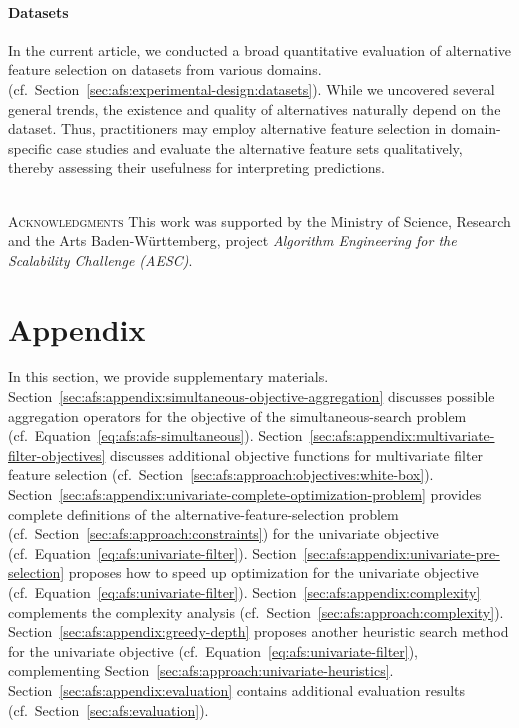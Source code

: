 \documentclass{article}
\theoremstyle{definition}
\begin{document}
\paragraph{Datasets}

In the current article, we conducted a broad quantitative evaluation of alternative feature selection on datasets from various domains. (cf.~Section~\ref{sec:afs:experimental-design:datasets}).
While we uncovered several general trends, the existence and quality of alternatives naturally depend on the dataset.
Thus, practitioners may employ alternative feature selection in domain-specific case studies and evaluate the alternative feature sets qualitatively, thereby assessing their usefulness for interpreting predictions.

~\\
\noindent \textsc{Acknowledgments}\quad
This work was supported by the Ministry of Science, Research and the Arts Baden-Württemberg, project \emph{Algorithm Engineering for the Scalability Challenge (AESC)}.

\appendix

\section{Appendix}
\label{sec:afs:appendix}

In this section, we provide supplementary materials.
Section~\ref{sec:afs:appendix:simultaneous-objective-aggregation} discusses possible aggregation operators for the objective of the simultaneous-search problem (cf.~Equation~\ref{eq:afs:afs-simultaneous}).
Section~\ref{sec:afs:appendix:multivariate-filter-objectives} discusses additional objective functions for multivariate filter feature selection (cf.~Section~\ref{sec:afs:approach:objectives:white-box}).
Section~\ref{sec:afs:appendix:univariate-complete-optimization-problem} provides complete definitions of the alternative-feature-selection problem (cf.~Section~\ref{sec:afs:approach:constraints}) for the univariate objective (cf.~Equation~\ref{eq:afs:univariate-filter}).
Section~\ref{sec:afs:appendix:univariate-pre-selection} proposes how to speed up optimization for the univariate objective (cf.~Equation~\ref{eq:afs:univariate-filter}).
Section~\ref{sec:afs:appendix:complexity} complements the complexity analysis (cf.~Section~\ref{sec:afs:approach:complexity}).
Section~\ref{sec:afs:appendix:greedy-depth} proposes another heuristic search method for the univariate objective (cf.~Equation~\ref{eq:afs:univariate-filter}), complementing Section~\ref{sec:afs:approach:univariate-heuristics}.
Section~\ref{sec:afs:appendix:evaluation} contains additional evaluation results (cf.~Section~\ref{sec:afs:evaluation}).
\end{document}
